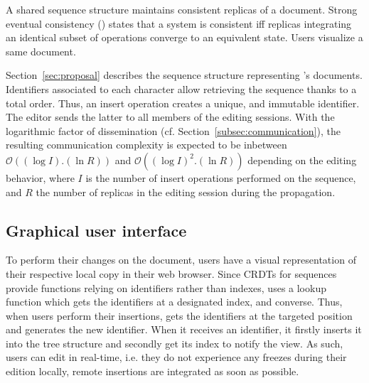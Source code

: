 A shared sequence structure maintains consistent replicas of a document. Strong
eventual consistency (\REF) states that a system is consistent iff replicas
integrating an identical subset of operations converge to an equivalent
state. Users visualize a same document.

Section~\ref{sec:proposal} describes the sequence structure representing
\CRATE's documents. Identifiers associated to each character allow retrieving
the sequence thanks to a total order. Thus, an insert operation creates a
unique, and immutable identifier. The editor sends the latter to all members of
the editing sessions. With the logarithmic factor of dissemination
(cf. Section~\ref{subsec:communication}), the resulting communication complexity
is expected to be inbetween $\mathcal{O}((\log I).(\ln R))$ and
$\mathcal{O}((\log I)^2.(\ln R))$ depending on the editing behavior, where $I$
is the number of insert operations performed on the sequence, and $R$ the number
of replicas in the editing session during the propagation.
    
\subsection{Graphical user interface}

To perform their changes on the document, users have a visual representation of
their respective local copy in their web browser.  Since CRDTs for sequences
provide functions relying on identifiers rather than indexes, \CRATE uses a
lookup function which gets the identifiers at a designated index, and converse.
Thus, when users perform their insertions, \CRATE gets the identifiers at the
targeted position and generates the new identifier. When it receives an
identifier, it firstly inserts it into the tree structure and secondly get its
index to notify the view. As such, users can edit in real-time, i.e. they do not
experience any freezes during their edition locally, remote insertions are
integrated as soon as possible.




